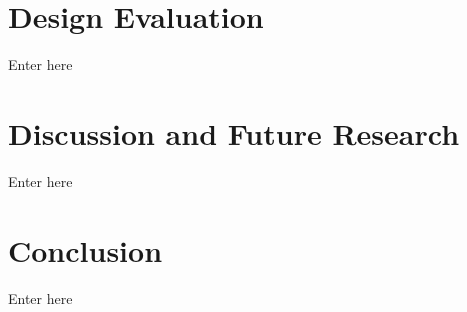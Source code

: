 \documentclass[mnsc]{informs3b} %
\begin{document}
\hspace{1cm} 



% 
% 



\section{Design Evaluation} \label{sec:eval}



Enter here

\section{Discussion and Future Research} \label{sec:discuss}

Enter here

\section{Conclusion} \label{sec:conclusion}

Enter here





\clearpage

\renewcommand{\theequation}{\arabic{equation}} 
\renewcommand{\thetable}{\arabic{table}}

\ECSwitch

% 
\end{document}
